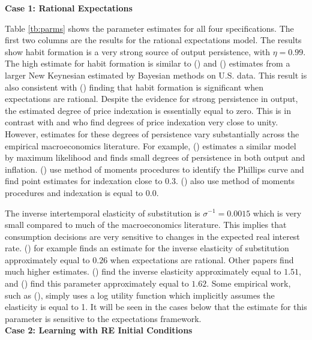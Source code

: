 \documentclass[11pt]{article}
\newcommand{\citee}[1]{\citeauthor*{#1} (\citeyear{#1})}
\begin{document}
\noindent \textbf{Case 1:  Rational Expectations}

Table \ref{tb:parms} shows the parameter estimates for all four specifications.  The first two columns are the results for the rational expectations model.  The results show habit formation is a very strong source of output persistence, with $\eta=0.99$.  The high estimate for habit formation is similar to \citeauthor*{smetswouters2005} (\citeyear{smetswouters2005}) and (\citeyear{smetswouters2007}) estimates from a larger New Keynesian estimated by Bayesian methods on U.S. data.  This result is also consistent with \citee{milani2007} finding that habit formation is significant when expectations are rational.  Despite the evidence for strong persistence in output, the estimated degree of price indexation is essentially equal to zero.  This is in contrast with \citeauthor*{smetswouters2005} and \citeauthor*{milani2007} who find degrees of price indexation very close to unity.  However, estimates for these degrees of persistence vary substantially across the empirical macroeconomics literature.  For example, \citee{ireland_tech_2004} estimates a similar model by maximum likelihood and finds small degrees of persistence in both output and inflation.  \citee{nasonsmith2005} use method of moments procedures to identify the Phillips curve and find point estimates for indexation close to 0.3.  \citee{csb2005} also use method of moments procedures and indexation is equal to 0.0.

The inverse intertemporal elasticity of substitution is $\sigma^{-1}=0.0015$ which is very small compared to much of the macroeconomics literature.  This implies that consumption decisions are very sensitive to changes in the expected real interest rate.  \citee{milani2007} for example finds an estimate for the inverse elasticity of substitution approximately equal to $0.26$ when expectations are rational.  Other papers find much higher estimates.  \citee{giannoni_woodford_2003} find the inverse elasticity approximately equal to $1.51$, and \citee{smetswouters2005} find this parameter approximately equal to $1.62$.  Some empirical work, such as \citee{ireland_tech_2004}, simply uses a log utility function which implicitly assumes the elasticity is equal to 1.  It will be seen in the cases below that the estimate for this parameter is sensitive to the expectations framework.\\

\noindent \textbf{Case 2:  Learning with RE Initial Conditions}
\end{document}
